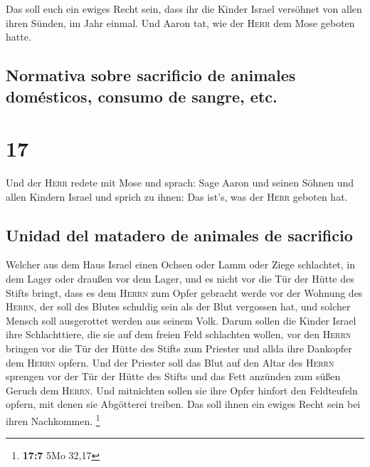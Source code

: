  Das soll euch ein ewiges Recht sein, dass ihr die Kinder
Israel versöhnet von allen ihren Sünden, im Jahr einmal. Und Aaron tat,
wie der \textsc{Herr} dem Mose geboten hatte.

\hypertarget{normativa-sobre-sacrificio-de-animales-domuxe9sticos-consumo-de-sangre-etc.}{%
\subsection{Normativa sobre sacrificio de animales domésticos, consumo
de sangre,
etc.}\label{normativa-sobre-sacrificio-de-animales-domuxe9sticos-consumo-de-sangre-etc.}}

\hypertarget{section-16}{%
\section{17}\label{section-16}}

 Und der \textsc{Herr} redete mit Mose und sprach:
 Sage Aaron und seinen Söhnen und allen Kindern Israel und
sprich zu ihnen: Das ist's, was der \textsc{Herr} geboten hat.

\hypertarget{unidad-del-matadero-de-animales-de-sacrificio}{%
\subsection{Unidad del matadero de animales de
sacrificio}\label{unidad-del-matadero-de-animales-de-sacrificio}}

 Welcher aus dem Haus Israel einen Ochsen oder Lamm oder
Ziege schlachtet, in dem Lager oder draußen vor dem Lager,
 und es nicht vor die Tür der Hütte des Stifts bringt,
dass es dem \textsc{Herrn} zum Opfer gebracht werde vor der Wohnung des
\textsc{Herrn}, der soll des Blutes schuldig sein als der Blut vergossen
hat, und solcher Mensch soll ausgerottet werden aus seinem Volk.
 Darum sollen die Kinder Israel ihre Schlachttiere, die
sie auf dem freien Feld schlachten wollen, vor den \textsc{Herrn}
bringen vor die Tür der Hütte des Stifts zum Priester und allda ihre
Dankopfer dem \textsc{Herrn} opfern.  Und der Priester
soll das Blut auf den Altar des \textsc{Herrn} sprengen vor der Tür der
Hütte des Stifts und das Fett anzünden zum süßen Geruch dem
\textsc{Herrn}.  Und mitnichten sollen sie ihre Opfer
hinfort den Feldteufeln opfern, mit denen sie Abgötterei treiben. Das
soll ihnen ein ewiges Recht sein bei ihren Nachkommen. \footnote{\textbf{17:7}
  5Mo 32,17}

